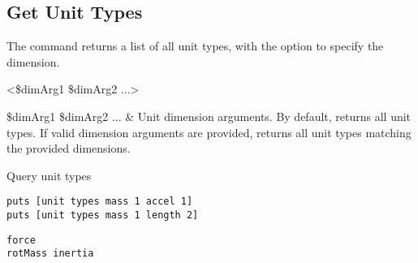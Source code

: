 \documentclass{article}
\begin{document}
\subsection{Get Unit Types}
The command  returns a list of all unit types, with the option to specify the dimension.
\begin{syntax}
 <\$dimArg1 \$dimArg2 ...>
\end{syntax}
\begin{args}
\$dimArg1 \$dimArg2 ... & Unit dimension arguments. By default, returns all unit types. If valid dimension arguments are provided, returns all unit types matching the provided dimensions.
\end{args}
\begin{example}{Query unit types}
\begin{lstlisting}
puts [unit types mass 1 accel 1]
puts [unit types mass 1 length 2]
\end{lstlisting}
\tcblower
\begin{lstlisting}
force
rotMass inertia
\end{lstlisting}
\end{example}
\clearpage
\end{document}

